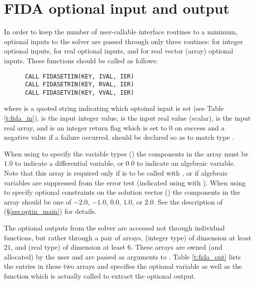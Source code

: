 \section{FIDA optional input and output}\label{fida_opt_inout}

In order to keep the number of user-callable {\fida} interface routines to
a minimum, optional inputs to the {\ida} solver are passed through only
three routines:  for integer optional inputs, 
for real optional inputs, and  for real vector (array) optional
inputs.  These functions should be called as follows:
\begin{verbatim}
      CALL FIDASETIIN(KEY, IVAL, IER)
      CALL FIDASETRIN(KEY, RVAL, IER)
      CALL FIDASETVIN(KEY, VVAL, IER)
\end{verbatim}
where  is a quoted string indicating which optoinal input is set
(see Table \ref{t:fida_in}),  is the input integer value,
 is the input real value (scalar),
 is the input real array, and
 is an integer return flag which is set to $0$ on success and
a negative value if a failure occurred.
 should be declared so as to match {\C} type .

When using  to specify the variable types ()
the components in the array  must be $1.0$ to indicate a differential 
variable, or $0.0$ to indicate an algebraic variable.
Note that this array is required only if  is to be called
with , or if algebraic variables are suppressed from the error
test (indicated using  with ).
%
When using  to specify optional constraints on the
solution vector () the components in the
array  should be one of $-2.0$, $-1.0$, $0.0$, $1.0$, or $2.0$.
See the description of  (\S\ref{sss:optin_main})
for details.

The optional outputs from the {\ida} solver are accessed not through
individual functions, but rather through a pair of arrays, 
(integer type) of dimension at least $21$, and  (real type) of
dimension at least $6$.  These arrays are owned (and allocated) by
the user and are passed as arguments to .  Table
\ref{t:fida_out} lists the entries in these two arrays and specifies
the optional variable as well as the {\ida} function which is actually
called to extract the optional output.

